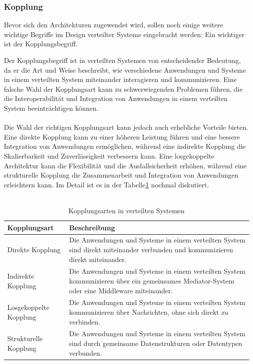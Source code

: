 \documentclass[../vs-script-first-v01.tex]{subfiles}
\begin{document}
\subsubsection{Kopplung}
Bevor sich den Architekturen zugewendet wird, sollen noch einige weitere wichtige Begriffe im Design verteilter Systeme eingebracht werden: Ein wichtiger ist der Kopplungsbegriff. 

Der Kopplungsbegriff ist in verteilten Systemen von entscheidender Bedeutung, da er die Art und Weise beschreibt, wie verschiedene Anwendungen und Systeme in einem verteilten System miteinander interagieren und kommunizieren. Eine falsche Wahl der Kopplungsart kann zu schwerwiegenden Problemen führen, die die Interoperabilität und Integration von Anwendungen in einem verteilten System beeinträchtigen können.
\\\\
Die Wahl der richtigen Kopplungsart kann jedoch auch erhebliche Vorteile bieten. Eine direkte Kopplung kann zu einer höheren Leistung führen und eine bessere Integration von Anwendungen ermöglichen, während eine indirekte Kopplung die Skalierbarkeit und Zuverlässigkeit verbessern kann. Eine losgekoppelte Architektur kann die Flexibilität  und die Ausfallsicherheit erhöhen, während eine strukturelle Kopplung die Zusammenarbeit und Integration von Anwendungen erleichtern kann. Im Detail ist es in der Tabelle\ref{tab:kopplungsarten} nochmal diskutiert.
\\\\
\begin{table}[!ht]
  \centering
  \caption{Kopplungsarten in verteilten Systemen}
  \label{tab:kopplungsarten}
  \begin{tabular}{|p{4cm}|p{7cm}|}
    \hline
    \textbf{Kopplungsart} & \textbf{Beschreibung} \\ \hline
    Direkte Kopplung & Die Anwendungen und Systeme in einem verteilten System sind direkt miteinander verbunden und kommunizieren direkt miteinander. \\ \hline
    Indirekte Kopplung & Die Anwendungen und Systeme in einem verteilten System kommunizieren über ein gemeinsames Mediator-System oder eine Middleware miteinander. \\ \hline
    Losgekoppelte Kopplung & Die Anwendungen und Systeme in einem verteilten System kommunizieren über Nachrichten, ohne sich direkt zu verbinden. \\ \hline
    Strukturelle Kopplung & Die Anwendungen und Systeme in einem verteilten System sind durch gemeinsame Datenstrukturen oder Datentypen verbunden. \\ \hline
  \end{tabular}
\end{table}
\end{document}
